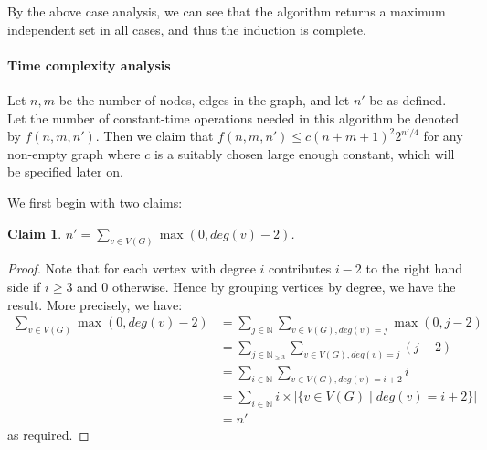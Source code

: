 \documentclass[answers]{exam}
\newtheorem{claim}{Claim}
\begin{document}
\begin{questions}
\begin{solution}
By the above case analysis, we can see that the algorithm returns a maximum independent set in all cases, and thus the induction is complete.

\paragraph{Time complexity analysis} Let $n, m$ be the number of nodes, edges in the graph, and let $n'$ be as defined. Let the number of constant-time operations
needed in this algorithm be denoted by $f(n, m, n')$. Then we claim that $f(n, m, n') \le c (n + m + 1)^2 2^{n'/4}$ for any non-empty graph where $c$ is a suitably chosen large enough constant, which will be specified later on.

We first begin with two claims:

\begin{claim}
    $n' = \sum_{v \in V(G)} \max(0, deg(v) - 2)$.
\end{claim}
\begin{proof}
    Note that for each vertex with degree $i$ contributes $i - 2$ to the right hand side if $i \ge 3$ and $0$ otherwise. Hence by grouping vertices by degree, we have the result. More precisely, we
    have:
    \begin{align*}
        \sum_{v \in V(G)} \max(0, deg(v) - 2)
           &= \sum_{j \in \mathbb{N}}\sum_{v \in V(G), deg(v) = j} \max(0, j - 2)\\
           &= \sum_{j \in \mathbb{N}_{\ge 3}}\sum_{v \in V(G), deg(v) = j} (j - 2)\\
           &= \sum_{i \in \mathbb{N}} \sum_{v \in V(G), deg(v) = i + 2} i\\
           &= \sum_{i \in \mathbb{N}} i \times |\{v \in V(G) \mid deg(v) = i + 2\}|\\
           &= n'
    \end{align*}
    as required.
\end{proof}


\end{solution}
\end{questions}
\end{document}
